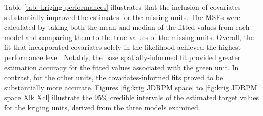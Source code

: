 \documentclass[12pt,	%
	a4paper,		%
	twoside,		%
	openright,		%
	titlepage,%
	]{book}
\theoremstyle{definition}
\begin{document}
Table \ref{tab: kriging performances} illustrates that the inclusion of covariates substantially improved the estimates for the missing units. The MSEs were calculated by taking both the mean and median of the fitted values from each model and comparing them to the true values of the missing units. Overall, the fit that incorporated covariates solely in the likelihood achieved the highest performance level. Notably, the base spatially-informed fit provided greater estimation accuracy for the fitted values associated with the green unit. In contrast, for the other units, the covariates-informed fits proved to be substantially more accurate. Figures \ref{fig:krig JDRPM space} to \ref{fig:krig JDRPM space Xlk Xcl} illustrate the 95\% credible intervals of the estimated target values for the kriging units, derived from the three models examined.
\end{document}
